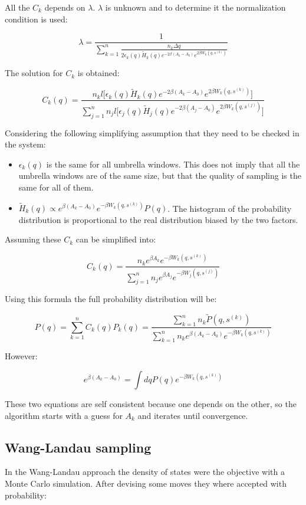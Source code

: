 	All the $C_k$ depends on $\lambda$.
	$\lambda$ is unknown and to determine it the normalization condition is used:

	$$\lambda = \frac{1}{\sum\limits_{k=1}^n\frac{n_k\Delta q}{2\epsilon_k(q)\tilde{H}_k(q)e^{-2\beta(A_k-A_0)}e^{2\beta W_k(q, s^{(k)})}}}$$

	The solution for $C_k$ is obtained:

	$$C_k(q) =\frac{n_kl\bigl[\epsilon_k(q)\tilde{H}_k(q)e^{-2\beta(A_k-A_0)}e^{2\beta W_k(q, s^{(k)})}\bigr]}{\sum\limits_{j=1}^n n_jl\bigl[\epsilon_j(q)\tilde{H}_j(q)e^{-2\beta(A_j-A_0)}e^{2\beta W_k(q, s^{(j)})}\bigr]}$$

	Considering the following simplifying assumption that they need to be checked in the system:

	\begin{multicols}{2}
		\begin{itemize}
			\item $\epsilon_k(q)$ is the same for all umbrella windows.
				This does not imply that all the umbrella windows are of the same size, but that the quality of sampling is the same for all of them.
			\item $\tilde{H}_k(q)\propto e^{\beta(A_k-A_0)}e^{-\beta W_k(q, s^{(k)})}P(q)$.
				The histogram of the probability distribution is proportional to the real distribution biased by the two factors.
		\end{itemize}
	\end{multicols}

	Assuming these $C_k$ can be simplified into:

	$$C_k(q) = \frac{n_ke^{\beta A_k}e^{-\beta W_k(q, s^{(k)})}}{\sum\limits_{j=1}^nn_je^{\beta A_j}e^{-\beta W_j(q, s^{(j)})}}$$

	Using this formula the full probability distribution will be:

	$$P(q) = \sum\limits_{k=1}^nC_k(q)P_k(q) = \frac{\sum\limits_{k=1}^nn_k\tilde{P}(q, s^{(k)})}{\sum\limits_{k=1}^nn_ke^{\beta(A_k-A_0)}e^{-\beta W_k(q, s^{(k)})}}$$

	However:

	$$e^{\beta(A_k-A_0)} = \int dq P(q)e^{-\beta W_k(q, s^{(k)})}$$

	These two equations are self consistent because one depends on the other, so the algorithm starts with a guess for $A_k$ and iterates until convergence.

	\subsection{Wang-Landau sampling}
	In the Wang-Landau approach the density of states were the objective with a Monte Carlo simulation.
	After devising some moves they where accepted with probability:


